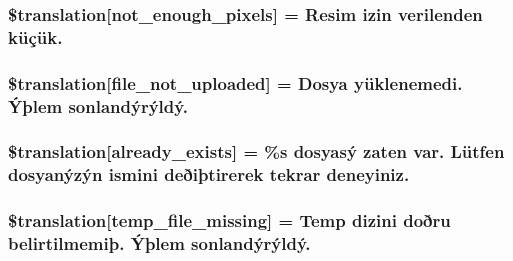 \subsubsection[{\$translation}]{\setlength{\rightskip}{0pt plus 5cm}\$translation\mbox{[}\textquotesingle{}not\+\_\+enough\+\_\+pixels\textquotesingle{}\mbox{]} = \textquotesingle{}Resim izin verilenden küçük.\textquotesingle{}}\label{class_8upload_8tr___t_r_8php_a1fe342c27ce61f4ff4e0120ba647033e}
\hypertarget{class_8upload_8tr___t_r_8php_a4ce76e7be0b3a03c2b47f6d70c21832e}{}
\subsubsection[{\$translation}]{\setlength{\rightskip}{0pt plus 5cm}\$translation\mbox{[}\textquotesingle{}file\+\_\+not\+\_\+uploaded\textquotesingle{}\mbox{]} = \textquotesingle{}Dosya yüklenemedi. Ýþlem sonlandýrýldý.\textquotesingle{}}\label{class_8upload_8tr___t_r_8php_a4ce76e7be0b3a03c2b47f6d70c21832e}
\hypertarget{class_8upload_8tr___t_r_8php_afd84e910217f04139f567c41e292afa5}{}
\subsubsection[{\$translation}]{\setlength{\rightskip}{0pt plus 5cm}\$translation\mbox{[}\textquotesingle{}already\+\_\+exists\textquotesingle{}\mbox{]} = \textquotesingle{}\%s dosyasý zaten var. Lütfen dosyanýzýn ismini deðiþtirerek tekrar deneyiniz.\textquotesingle{}}\label{class_8upload_8tr___t_r_8php_afd84e910217f04139f567c41e292afa5}
\hypertarget{class_8upload_8tr___t_r_8php_ab0fa87a88aba2624004581eed0633325}{}
\subsubsection[{\$translation}]{\setlength{\rightskip}{0pt plus 5cm}\$translation\mbox{[}\textquotesingle{}temp\+\_\+file\+\_\+missing\textquotesingle{}\mbox{]} = \textquotesingle{}Temp dizini doðru belirtilmemiþ. Ýþlem sonlandýrýldý.\textquotesingle{}}\label{class_8upload_8tr___t_r_8php_ab0fa87a88aba2624004581eed0633325}
\hypertarget{class_8upload_8tr___t_r_8php_aceaaf7355acaaf10f0ae60378d03c468}{}
